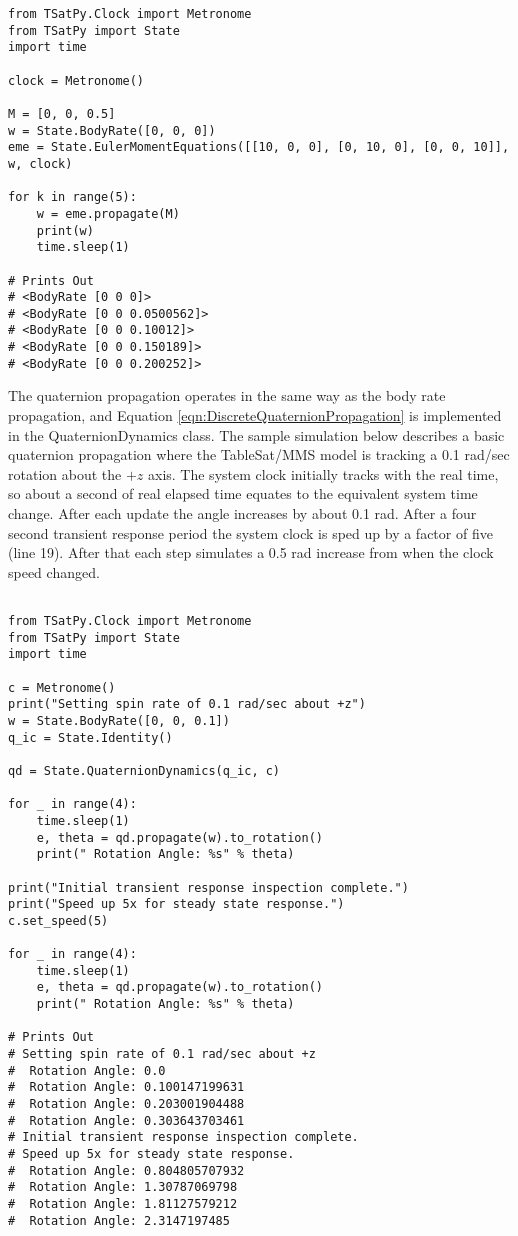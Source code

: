 \begin{singlespace}
  \begin{verbatim}
from TSatPy.Clock import Metronome
from TSatPy import State
import time

clock = Metronome()

M = [0, 0, 0.5]
w = State.BodyRate([0, 0, 0])
eme = State.EulerMomentEquations([[10, 0, 0], [0, 10, 0], [0, 0, 10]], w, clock)

for k in range(5):
    w = eme.propagate(M)
    print(w)
    time.sleep(1)

# Prints Out
# <BodyRate [0 0 0]>
# <BodyRate [0 0 0.0500562]>
# <BodyRate [0 0 0.10012]>
# <BodyRate [0 0 0.150189]>
# <BodyRate [0 0 0.200252]>
  \end{verbatim}
\nocite{minted}
\end{singlespace}

The quaternion propagation operates in the same way as the body rate propagation, and Equation \ref{eqn:DiscreteQuaternionPropagation} is implemented in the QuaternionDynamics class.  The sample simulation below describes a basic quaternion propagation where the TableSat/MMS model is tracking a 0.1 rad/sec rotation about the $+z$ axis.  The system clock initially tracks with the real time, so about a second of real elapsed time equates to the equivalent system time change.  After each update the angle increases by about 0.1 rad.  After a four second transient response period the system clock is sped up by a factor of five (line 19).  After that each step simulates a 0.5 rad increase from when the clock speed changed.

\begin{singlespace}
  \begin{verbatim}

from TSatPy.Clock import Metronome
from TSatPy import State
import time

c = Metronome()
print("Setting spin rate of 0.1 rad/sec about +z")
w = State.BodyRate([0, 0, 0.1])
q_ic = State.Identity()

qd = State.QuaternionDynamics(q_ic, c)

for _ in range(4):
    time.sleep(1)
    e, theta = qd.propagate(w).to_rotation()
    print(" Rotation Angle: %s" % theta)

print("Initial transient response inspection complete.")
print("Speed up 5x for steady state response.")
c.set_speed(5)

for _ in range(4):
    time.sleep(1)
    e, theta = qd.propagate(w).to_rotation()
    print(" Rotation Angle: %s" % theta)

# Prints Out
# Setting spin rate of 0.1 rad/sec about +z
#  Rotation Angle: 0.0
#  Rotation Angle: 0.100147199631
#  Rotation Angle: 0.203001904488
#  Rotation Angle: 0.303643703461
# Initial transient response inspection complete.
# Speed up 5x for steady state response.
#  Rotation Angle: 0.804805707932
#  Rotation Angle: 1.30787069798
#  Rotation Angle: 1.81127579212
#  Rotation Angle: 2.3147197485
  \end{verbatim}
  \nocite{minted}
\end{singlespace}

